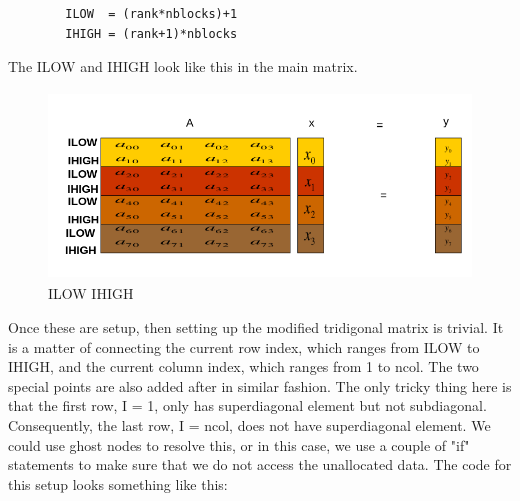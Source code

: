 \documentclass[12pt]{article}
\begin{document}
    \begin{lstlisting}
        ILOW  = (rank*nblocks)+1
        IHIGH = (rank+1)*nblocks
    \end{lstlisting}
    \noindent
    The ILOW and IHIGH look like this in the main matrix. 


    \begin{figure}[H]
		\hfill\includegraphics[width=120mm,height= 50mm]{lowhigh.png}\hspace*{\fill}
		\caption{ILOW IHIGH}
    \end{figure}



    Once these are setup, then setting up the modified tridigonal matrix is trivial. It is a matter of connecting the current row index, which ranges from ILOW to IHIGH, and the current column index, which ranges from 1 to ncol. The two special points are also added after in similar fashion. The only tricky thing here is that the first row, I = 1, only has superdiagonal element but not subdiagonal.  Consequently, the last row, I = ncol, does not have superdiagonal element. We could use ghost nodes to resolve this, or in this case, we use a couple of "if" statements to make sure that we do not access the unallocated data.  The code for this setup looks something like this:
    
\end{document}
